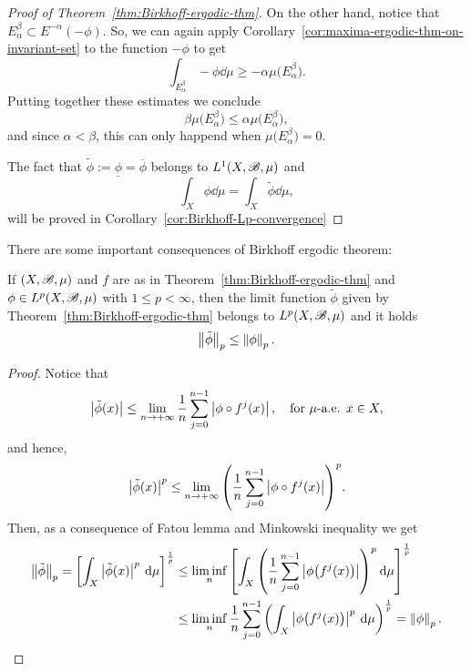 \begin{proof}[Proof of Theorem~\ref{thm:Birkhoff-ergodic-thm}]
  On the other hand, notice that $E_{\alpha}^{\beta}\subset E^{-\alpha}(-\phi)$. So, we can again apply Corollary~\ref{cor:maxima-ergodic-thm-on-invariant-set} to the function $-\phi$ to get
  \begin{displaymath}
    \int_{E_\alpha^\beta}-\phi\dd\mu\geq-\alpha\mu\Big(E_\alpha^\beta\Big).
  \end{displaymath}
  Putting together these estimates we conclude
  \begin{displaymath}
    \beta\mu\Big(E_\alpha^\beta\Big) \leq \alpha\mu\Big(E_\alpha^\beta\Big),
  \end{displaymath}
  and since $\alpha<\beta$, this can only happend when $\mu\Big(E_\alpha^\beta\Big)=0$.

  The fact that $\tilde\phi:=\underline{\phi}=\overline{\phi}$ belongs to $L^{1}(X,\mathscr{B},\mu)$ and
  \begin{displaymath}
    \int_{X}\phi\dd\mu=\int_{X}\tilde\phi\dd\mu,
  \end{displaymath}
  will be proved in Corollary~\ref{cor:Birkhoff-Lp-convergence}
\end{proof}

There are some important consequences of Birkhoff ergodic theorem:

\begin{corollary}\label{cor:Birkhoff-tilde-phi-in-Lp-when-phi-in-Lp}
  If $(X,\mathscr{B},\mu)$ and $f$ are as in Theorem~\ref{thm:Birkhoff-ergodic-thm} and $\phi\in L^{p}(X,\mathscr{B},\mu)$ with $1\leq p<\infty$, then the limit function $\tilde\phi$ given by Theorem~\ref{thm:Birkhoff-ergodic-thm} belongs to $L^{p}(X,\mathscr{B},\mu)$ and it holds
  \begin{displaymath}
    \left\|{\tilde\phi}\right\|_{p}\leq \left\|{\phi}\right\|_{p}.
  \end{displaymath}
\end{corollary}


\begin{proof}
  Notice that
  \begin{displaymath}
    \left\lvert{\tilde\phi(x)}\right\rvert\leq \lim_{n\to+\infty}\frac{1}{n}\sum_{j=0}^{n-1}\left\lvert{\phi\circ f^{j}(x)}\right\rvert, \quad\text{for }\mu\text{-a.e. } x\in X,
  \end{displaymath}
  and hence,
  \begin{displaymath}
    \left\lvert{\tilde\phi(x)}\right\rvert^{p}\leq \lim_{n\to+\infty}{\left(\frac{1}{n}\sum_{j=0}^{n-1}\left\lvert{\phi\circ f^{j}(x)}\right\rvert\right)}^{p}.
  \end{displaymath}
  Then, as a consequence of Fatou lemma and Minkowski inequality we get
  \begin{displaymath}
    \begin{split}
      \left\|{\tilde\phi}\right\|_{p}={\left[\int_{X}\left\lvert{\tilde\phi(x)}\right\rvert^{p}\:\mathrm{d}\mu\right]}^{\frac{1}{p}} &\leq \liminf_{n} {\left[\int_{X}{\left(\frac{1}{n}\sum_{j=0}^{n-1}\left\lvert{\phi\big(f^{j}(x)\big)}\right\rvert\right)}^{p}\:\mathrm{d}\mu\right]}^{\frac{1}{p}}\\
      & \leq \liminf_{n} \frac{1}{n}\sum_{j=0}^{n-1} {\left(\int_{X}\left\lvert{\phi\big(f^{j}(x)\big)}\right\rvert^{p}\:\mathrm{d}\mu\right)}^{\frac{1}{p}} =\left\|{\phi}\right\|_{p}.
    \end{split}
  \end{displaymath}
\end{proof}

